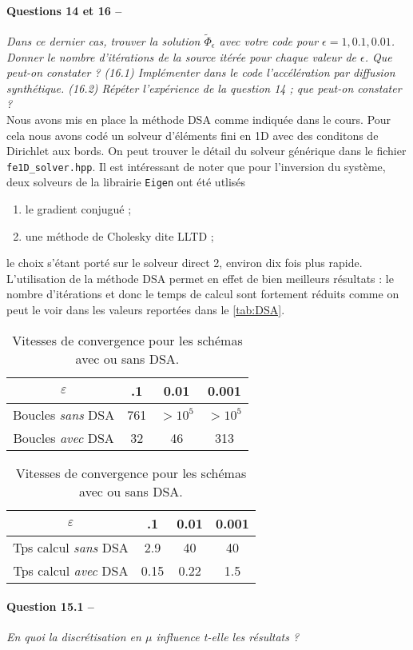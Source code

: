\documentclass[11pt,a4paper]{article}
\newcommand{\question}[2]{\paragraph{Question #1 --}\hspace{-7pt}\textit{#2} \\}
\newcommand{\questions}[2]{\paragraph{Questions #1 --}\hspace{-7pt}\textit{#2} \\}
\newcommand{\Phit}{\widetilde{\Phi}}
\begin{document}
\questions{14 et 16}{Dans ce dernier cas, trouver la solution $\Phit_\epsilon$ avec votre code pour $\epsilon = 1, 0.1, 0.01$. Donner le nombre d'itérations de la source itérée pour chaque valeur de $\epsilon$. Que peut-on constater ? (16.1) Implémenter dans le code l'accélération par diffusion synthétique. (16.2) Répéter l'expérience de la question 14 ; que peut-on constater ?}

Nous avons mis en place la méthode DSA comme indiquée dans le cours. Pour cela nous avons codé un solveur d'éléments fini en 1D avec des conditons de Dirichlet aux bords. On peut trouver le détail du solveur générique dans le fichier \texttt{fe1D\_solver.hpp}. Il est intéressant de noter que pour l'inversion du système, deux solveurs de la librairie \texttt{Eigen} ont été utlisés
\begin{enumerate}
\item le gradient conjugué ;
\item une méthode de Cholesky dite LLTD ;
\end{enumerate}
le choix s'étant porté sur le solveur direct 2, environ dix fois plus rapide. L'utilisation de la méthode DSA permet en effet de bien meilleurs résultats : le nombre d'itérations et donc le temps de calcul sont fortement réduits comme on peut le voir dans les valeurs reportées dans le \autoref{tab:DSA}. 

\begin{table}
  \centering
  \begin{tabular}{c|ccc}
    $\varepsilon $ & .1 & 0.01 & 0.001 \\
    \hline
    Boucles \textit{sans} DSA & 761 & $>10^5$ & $>10^5$ \\
    Boucles \textit{avec} DSA & 32 & 46 & 313 \\
  \end{tabular}
  \hspace{50pt}
  \begin{tabular}{c|ccc}
    $\varepsilon $ & .1 & 0.01 & 0.001 \\
    \hline
    Tps calcul \textit{sans} DSA & 2.9 & 40 & 40 \\
    Tps calcul \textit{avec} DSA & 0.15 & 0.22 & 1.5 \\
  \end{tabular}
\caption{Vitesses de convergence pour les schémas avec ou sans DSA.}
\label{tab:DSA}
\end{table}


\question{15.1}{En quoi la discrétisation en $\mu$ influence t-elle les résultats ?}
\end{document}
